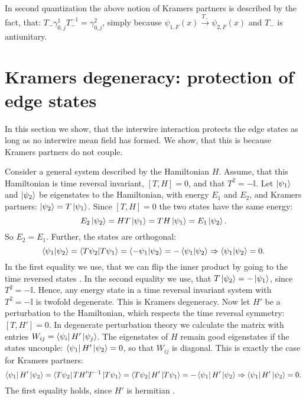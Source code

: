 In second quantization the above notion of Kramers partners is described by the fact, that: $T_-\gamma^1_{0,j}T_-^{-1} = \gamma^2_{0,j}$, simply because $\psi_{1,F}(x) \overset{T_-}{\to} \psi_{2,F}(x)$ and $T_-$ is antiunitary.

\section{Kramers degeneracy: protection of edge states}
\label{sec.2wireskramersdegeneracy}
In this section we show, that the interwire interaction protects the edge states as long as no interwire mean field has formed. We show, that this is because Kramers partners do not couple.

Consider a general system described by the Hamiltonian $H$. Assume, that this Hamiltonian is time reversal invariant, $[T, H] = 0$, and that $T^2 = -\mathbb{I}$. Let $\ket{\psi_1}$ and $\ket{\psi_2}$ be eigenstates to the Hamiltonian, with energy $E_1$ and $E_2$, and Kramers partners: $\ket{\psi_2} = T\ket{\psi_1}$. Since $[T, H] = 0$ the two states have the same energy: 
\begin{equation}
E_2\ket{\psi_2} = HT\ket{\psi_1} = TH\ket{\psi_1} = E_1\ket{\psi_2}. \nonumber
\end{equation}
So $E_2 = E_1$. Further, the states are orthogonal:
\begin{equation}
\braket{\psi_1|\psi_2} = \braket{T\psi_2|T\psi_1} = \braket{-\psi_1|\psi_2} = -\braket{\psi_1|\psi_2} \Rightarrow \braket{\psi_1|\psi_2} = 0. \nonumber  
\end{equation}
In the first equality we use, that we can flip the inner product by going to the time reversed states \cite[p. 274]{Sakurai}. In the second equality we use, that $T\ket{\psi_2} = -\ket{\psi_1}$, since $T^2 = -\mathbb{I}$. Hence, any energy state in a time reversal invariant system with $T^2 = -\mathbb{I}$ is twofold degenerate. This is Kramers degeneracy. Now let $H'$ be a perturbation to the Hamiltonian, which respects the time reversal symmetry: $[T, H'] = 0$. In degenerate perturbation theory we calculate the matrix with entries $W_{ij} = \bra{\psi_i}H'\ket{\psi_j}$. The eigenstates of $H$ remain good eigenstates if the states uncouple: $\bra{\psi_1}H'\ket{\psi_2} = 0$, so that $W_{ij}$ is diagonal. This is exactly the case for Kramers partners: 
\begin{equation}
\bra{\psi_1}H'\ket{\psi_2} = \bra{T\psi_2}TH'T^{-1}\ket{T\psi_1} = \bra{T\psi_2}H'\ket{T\psi_1} = -\bra{\psi_1}H'\ket{\psi_2} \Rightarrow \bra{\psi_1}H'\ket{\psi_2} = 0. \nonumber
\end{equation}
The first equality holds, since $H'$ is hermitian \cite[p. 274]{Sakurai}. 

